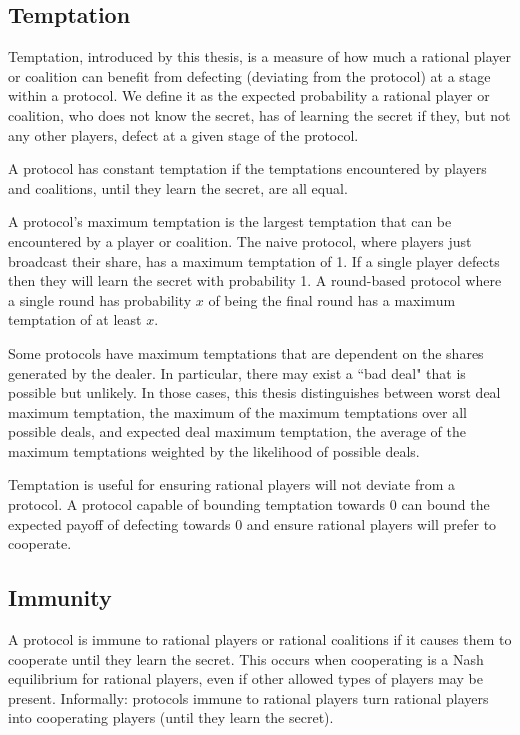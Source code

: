 \documentclass[12pt]{dalcsthesis}
\begin{document}
\subsection{Temptation}

Temptation, introduced by this thesis, is a measure of how much a rational player or coalition can benefit from defecting (deviating from the protocol) at a stage within a protocol. We define it as the expected probability a rational player or coalition, who does not know the secret, has of learning the secret if they, but not any other players, defect at a given stage of the protocol.

A protocol has constant temptation if the temptations encountered by players and coalitions, until they learn the secret, are all equal.

A protocol's maximum temptation is the largest temptation that can be encountered by a player or coalition. The naive protocol, where players just broadcast their share, has a maximum temptation of 1. If a single player defects then they will learn the secret with probability 1. A round-based protocol where a single round has probability $x$ of being the final round has a maximum temptation of at least $x$.

Some protocols have maximum temptations that are dependent on the shares generated by the dealer. In particular, there may exist a ``bad deal" that is possible but unlikely. In those cases, this thesis distinguishes between worst deal maximum temptation, the maximum of the maximum temptations over all possible deals, and expected deal maximum temptation, the average of the maximum temptations weighted by the likelihood of possible deals.

Temptation is useful for ensuring rational players will not deviate from a protocol. A protocol capable of bounding temptation towards 0 can bound the expected payoff of defecting towards 0 and ensure rational players will prefer to cooperate.

\subsection {Immunity}
\label{Def:Immunity}

A protocol is immune to rational players or rational coalitions if it causes them to cooperate until they learn the secret. This occurs when cooperating is a Nash equilibrium for rational players, even if other allowed types of players may be present. Informally: protocols immune to rational players turn rational players into cooperating players (until they learn the secret).
\end{document}
